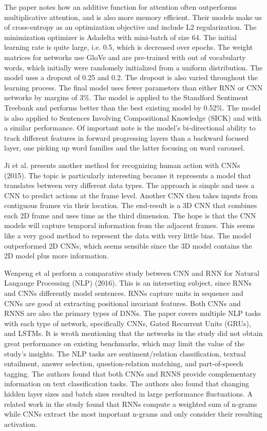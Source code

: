 The paper notes how an additive function for attention often outperforms multiplicative attention, and is also more memory efficient.  Their models make us of cross-entropy as an optimization objective and include L2 regularization.  The minimization optimizer is Adadelta with mini-batch of size 64.  The initial learning rate is quite large, i.e. 0.5, which is decreased over epochs.  The weight matrices for networks use GloVe and are pre-trained with out of vocabularty words, which initially were randomely initialized from a uniform distribution.  The model uses a dropout of 0.25 and 0.2.  The dropout is also varied throughout the learning process.  The final model uses fewer parameters than either RNN or CNN networks by margins of 3\%.  The model is applied to the Standford Sentiment Treebank and performs better than the best existing model by 0.52\%.  The model is also applied to Sentences Involving Compositional Knowledge (SICK) and with a similar performance.  Of important note is the model's bi-directional ability to track different features in forward progressing layers than a backward focused layer, one picking up word families and the latter focusing on word carousel.

Ji et al. presents another method for recognizing human action with CNNs (2015).  The topic is particularly interesting because it represents a model that translates between very different data types.   The approach is simple and uses a CNN to predict actions at the frame level.  Another CNN then takes inputs from contiguous frames via their location.  The end-result is a 3D CNN that combines each 2D frame and uses time as the third dimension.  The hope is that the CNN models will capture temporal information from the adjacent frames.  This seems like a very good method to represent the data with very little bias.  The model outperformed 2D CNNs, which seems sensible since the 3D model contains the 2D model plus more information.

Wenpeng et al perform a comparative study between CNN and RNN for Natural Langauge Processing (NLP) (2016).  This is an interseting subject, since RNNs and CNNs differently model sentences.  RNNs capture units in sequence and CNNs are good at extracting positional invariant features.  Both CNNs and RNNS are also the primary types of DNNs.  The paper covers multiple NLP tasks with each type of network, specifically CNNs, Gated Recurrent Units (GRUs), and LSTMs.  It is wroth mentioning that the networks in the study did not obtain great performance on existing benchmarks, which may limit the value of the study's insights.  The NLP tasks are sentiment/relation classification, textual entailment, answer selection, question-relation matching, and part-of-speech tagging.  The authors found that both CNNs and RNNS provide complementary information on text classification tasks.  The authors also found that changing hidden layer sizes and batch sizes resulted in large performance fluctuations.  A related work in the study found that RNNs compute a weighted sum of n-grams while CNNs extract the most important n-grams and only consider their resulting activation.

